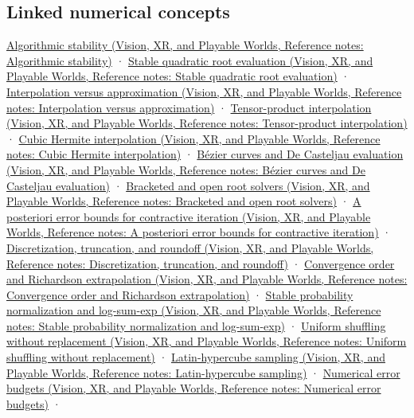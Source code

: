 \subsection{Linked numerical concepts}\label{appendix-cb5af353ef77-linked-numerical-concepts}

\href{../07-Vision-XR-and-Playable-Worlds/main.pdf\#nameddest=appendix-aa2bf0d79639}{Algorithmic stability (Vision, XR, and Playable Worlds, Reference notes: Algorithmic stability)} · \href{../07-Vision-XR-and-Playable-Worlds/main.pdf\#nameddest=appendix-b9afba7f63e5}{Stable quadratic root evaluation (Vision, XR, and Playable Worlds, Reference notes: Stable quadratic root evaluation)} · \href{../07-Vision-XR-and-Playable-Worlds/main.pdf\#nameddest=appendix-0c2a5f69851e}{Interpolation versus approximation (Vision, XR, and Playable Worlds, Reference notes: Interpolation versus approximation)} · \href{../07-Vision-XR-and-Playable-Worlds/main.pdf\#nameddest=appendix-0a09b6dfdc86}{Tensor-product interpolation (Vision, XR, and Playable Worlds, Reference notes: Tensor-product interpolation)} · \href{../07-Vision-XR-and-Playable-Worlds/main.pdf\#nameddest=appendix-db3aef8f2fd6}{Cubic Hermite interpolation (Vision, XR, and Playable Worlds, Reference notes: Cubic Hermite interpolation)} · \href{../07-Vision-XR-and-Playable-Worlds/main.pdf\#nameddest=appendix-ddbec701898c}{Bézier curves and De Casteljau evaluation (Vision, XR, and Playable Worlds, Reference notes: Bézier curves and De Casteljau evaluation)} · \href{../07-Vision-XR-and-Playable-Worlds/main.pdf\#nameddest=appendix-f63eb850796d}{Bracketed and open root solvers (Vision, XR, and Playable Worlds, Reference notes: Bracketed and open root solvers)} · \href{../07-Vision-XR-and-Playable-Worlds/main.pdf\#nameddest=appendix-d83b0ad1be7f}{A posteriori error bounds for contractive iteration (Vision, XR, and Playable Worlds, Reference notes: A posteriori error bounds for contractive iteration)} · \href{../07-Vision-XR-and-Playable-Worlds/main.pdf\#nameddest=appendix-6b0648b2b8e8}{Discretization, truncation, and roundoff (Vision, XR, and Playable Worlds, Reference notes: Discretization, truncation, and roundoff)} · \href{../07-Vision-XR-and-Playable-Worlds/main.pdf\#nameddest=appendix-aca80b6bf17a}{Convergence order and Richardson extrapolation (Vision, XR, and Playable Worlds, Reference notes: Convergence order and Richardson extrapolation)} · \href{../07-Vision-XR-and-Playable-Worlds/main.pdf\#nameddest=appendix-d580b422240f}{Stable probability normalization and log-sum-exp (Vision, XR, and Playable Worlds, Reference notes: Stable probability normalization and log-sum-exp)} · \href{../07-Vision-XR-and-Playable-Worlds/main.pdf\#nameddest=appendix-184fcc411663}{Uniform shuffling without replacement (Vision, XR, and Playable Worlds, Reference notes: Uniform shuffling without replacement)} · \href{../07-Vision-XR-and-Playable-Worlds/main.pdf\#nameddest=appendix-1c5e85693a06}{Latin-hypercube sampling (Vision, XR, and Playable Worlds, Reference notes: Latin-hypercube sampling)} · \href{../07-Vision-XR-and-Playable-Worlds/main.pdf\#nameddest=appendix-31b8c295e05f}{Numerical error budgets (Vision, XR, and Playable Worlds, Reference notes: Numerical error budgets)} · 